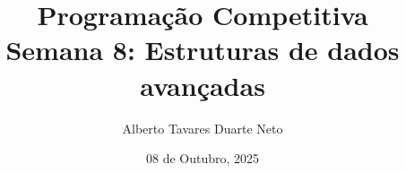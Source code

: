 \documentclass{beamer}
\title{{\Large Programação Competitiva}\\ Semana 8: Estruturas de dados avançadas}
\date{08 de Outubro, 2025}
\author{Alberto Tavares Duarte Neto}
\institute{Universidade de Brasília}
\numberwithin{equation}{subsection}
\begin{document}
    \maketitle
    \small

    
    
    
    
    
    

    

    

    
    
    
    
    
\end{document}
